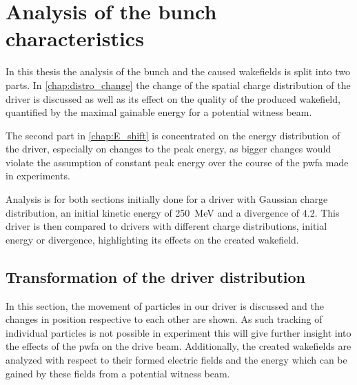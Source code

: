 \documentclass[bachelor_thesis]{subfiles}
\begin{document}
\chapter{Analysis of the bunch characteristics}\label{chap:analysis}
In this thesis the analysis of the bunch and the caused wakefields is split into two parts. In \autoref{chap:distro_change} the change of the spatial charge distribution of the driver is discussed as well as its effect on the quality of the produced wakefield, quantified by the maximal gainable energy for a potential witness beam.

The second part in \autoref{chap:E_shift} is concentrated on the energy distribution of the driver, especially on changes to the peak energy, as bigger changes would violate the assumption of constant peak energy over the course of the \gls{pwfa} made in experiments.

Analysis is for both sections initially done for a driver with Gaussian charge distribution, an initial kinetic energy of \qty{250}{\MeV} and a divergence of \qty{4.2}{\mrad}. This driver is then compared to drivers with different charge distributions, initial energy or divergence,
highlighting its effects on the created wakefield. 
 
\section{Transformation of the driver distribution} \label{chap:distro_change}
In this section, the movement of particles in our driver is discussed and the changes in position respective to each other are shown. As such tracking of individual particles is not possible in experiment
this will give further insight into the effects of the \gls{pwfa} on the drive beam. Additionally, the created wakefields are analyzed with respect to their formed electric fields and the energy which can be
gained by these fields from a potential witness beam. 
\end{document}
